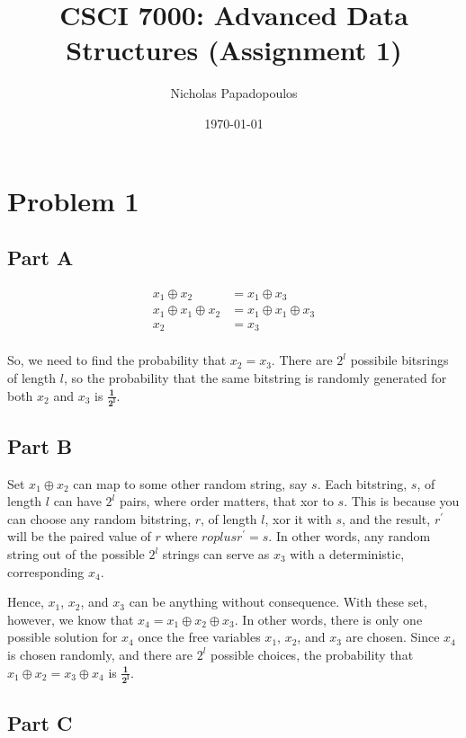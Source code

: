 \documentclass[answers, 12pt]{article}
\begin{document}
\title{CSCI 7000: Advanced Data Structures (Assignment 1)}
\author{Nicholas Papadopoulos}
\date{\today}
\maketitle


\section*{Problem 1}
\subsection*{Part A}

\begin{align*}
  x_1 \oplus x_2 &= x_1 \oplus x_3 \\
  x_1 \oplus x_1 \oplus x_2 &= x_1 \oplus x_1 \oplus x_3 \\
  x_2 &= x_3 \\
\end{align*}

So, we need to find the probability that $x_2 = x_3$. There are $2^l$ possibile bitsrings of length $l$, so the probability that the same bitstring is randomly generated for both $x_2$ and $x_3$ is $\boldsymbol{\frac{1}{2^l}}$.


\subsection*{Part B}

Set $x_1 \oplus x_2$ can map to some other random string, say $s$. Each bitstring, $s$, of length $l$ can have $2^l$ pairs, where order matters, that xor to $s$. This is because you can choose any random bitstring, $r$, of length $l$, xor it with $s$, and the result, $r^\prime$ will be the paired value of $r$ where $r oplus r^\prime = s$. In other words, any random string out of the possible $2^l$ strings can serve as $x_3$ with a deterministic, corresponding $x_4$.

Hence, $x_1$, $x_2$, and $x_3$ can be anything without consequence. With these set, however, we know that $x_4 = x_1 \oplus x_2 \oplus x_3$. In other words, there is only one possible solution for $x_4$ once the free variables $x_1$, $x_2$, and $x_3$ are chosen. Since $x_4$ is chosen randomly, and there are $2^l$ possible choices, the probability that $x_1 \oplus x_2 = x_3 \oplus x_4$ is $\boldsymbol{\frac{1}{2^l}}$.


\subsection*{Part C}
\end{document}
